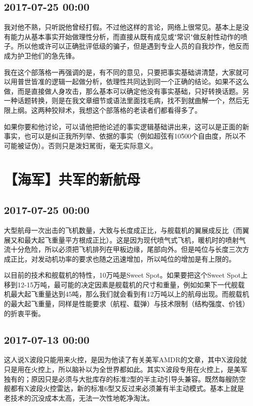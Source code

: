 \documentclass[twocolumn]{ctexart}
\begin{document}
\subsection*{2017-07-25 00:00}
我对他不熟，只听説他曾经打假。不过他这样的言论，网络上很常见。基本上是没有能力从基本事实开始做理性分析，而直接从既有成见或"常识"做反射性动作的喷子。所以他或许可以正确批评低级的骗子，但是遇到专业人员的自我炒作，他反而成为护卫他们的急先锋。

我在这个部落格一再强调的是，有不同的意见，只要把事实基础讲清楚，大家就可以用普世皆准的逻辑一起做分析，依理性共同达到同一个正确的结论。如果不这么做，而是直接做人身攻击，那么基本可以确定他没有事实基础，只好转换话题。另一种话题转换，则是在我文章细节或语法里面找毛病，找不到就曲解一个，然后无限上纲。这两种狡辩术，我想这个部落格的老读者们都看得多了。

如果你要和他讨论，可以请他把他论述的事实逻辑基础讲出来，这可以是正面的新事实，也可以是纠正我所列举、依据的事实（例如超弦有10\^500个自由度，所以不可能被证伪）。否则只是泼妇駡街，毫无实际意义。\section*{【海军】共军的新航母}
\subsection*{2017-07-25 00:00}
大型航母一次出击的飞机数量，大致与长度成正比，与舰载机的翼展成反比（而翼展又和最大起飞重量平方根成正比）。这是因为现代喷气式飞机，暖机时的喷射气流十分危险，所以必须把飞机排列在甲板边缘，尾部向外。但是吨位与长度三次方成正比，对发动机功率的要求也随之迅速增加，所以吨位的增加是有上限的。

以目前的技术和舰载机的特性，10万吨是Sweet Spot。如果要把这个Sweet Spot上移到12-15万吨，最可能的决定因素是舰载机的尺寸和重量，例如如果下一代舰载机最大起飞重量达到45吨，那么我们就会看到有12万吨以上的航母出现。而舰载机的最大起飞重量，同样是性能要求（航程、载弹）与技术限制（结构强度、价钱）的折衷平衡。\subsection*{2017-07-13 00:00}
这人说X波段只能用来火控，是因为他读了有关美军AMDR的文章，其中X波段就只是用在火控上，所以脑补以为全世界都如此。其实X波段专用在火控上，是美军独有的；原因只是必须与大批库存的标准2型的半主动引导头兼容。既然每艘防空舰都有X波段火控雷达，新的标准6型又反过来必须兼有半主动模式。基本上就是老技术的沉没成本太高，无法一次性地乾净淘汰。
\end{document}
